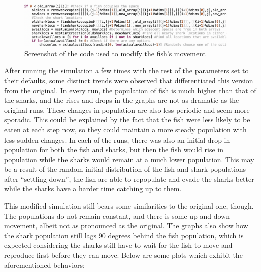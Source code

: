 \documentclass[12pt]{iopart} %
\begin{document}
\begin{figure}[htbp]
  \begin{center}
  \item[]\includegraphics[width=0.95\textwidth]{modifiedFishMovement.png}
  \caption{\label{fig:modifiedFishMovement}
  Screenshot of the code used to modify the fish’s movement
  }
  \end{center}
\end{figure}


After running the simulation a few times with the rest of the parameters set to their defaults, some distinct trends were observed that differentiated this version from the original. 
In every run, the population of fish is much higher than that of the sharks, and the rises and drops in the graphs are not as dramatic as the original runs. 
These changes in population are also less periodic and seem more sporadic. 
This could be explained by the fact that the fish were less likely to be eaten at each step now, so they could maintain a more steady population with less sudden changes. 
In each of the runs, there was also an initial drop in population for both the fish and sharks, but then the fish would rise in population while the sharks would remain at a much lower population. 
This may be a result of the random initial distribution of the fish and shark populations – after “settling down”, the fish are able to repopulate and evade the sharks better while the sharks have a harder time catching up to them.

This modified simulation still bears some similarities to the original one, though. 
The populations do not remain constant, and there is some up and down movement, albeit not as pronounced as the original. 
The graphs also show how the shark population still lags 90 degrees behind the fish population, which is expected considering the sharks still have to wait for the fish to move and reproduce first before they can move. 
Below are some plots which exhibit the aforementioned behaviors:
\end{document}
